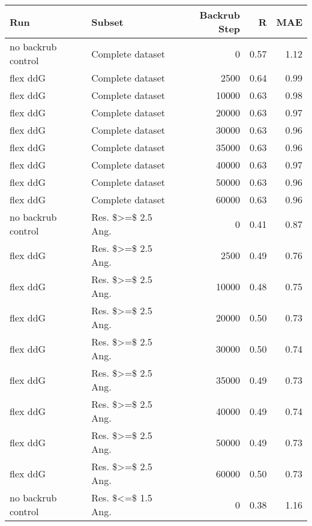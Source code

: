 \begin{table}
\begin{tabular}{llrrr}
\toprule
                Run &                          Subset &  Backrub Step &    R &  MAE \\
\midrule
 no backrub control &                Complete dataset &             0 & 0.57 & 1.12 \\
           flex ddG &                Complete dataset &          2500 & 0.64 & 0.99 \\
           flex ddG &                Complete dataset &         10000 & 0.63 & 0.98 \\
           flex ddG &                Complete dataset &         20000 & 0.63 & 0.97 \\
           flex ddG &                Complete dataset &         30000 & 0.63 & 0.96 \\
           flex ddG &                Complete dataset &         35000 & 0.63 & 0.96 \\
           flex ddG &                Complete dataset &         40000 & 0.63 & 0.97 \\
           flex ddG &                Complete dataset &         50000 & 0.63 & 0.96 \\
           flex ddG &                Complete dataset &         60000 & 0.63 & 0.96 \\
 no backrub control &              Res. \$>=\$ 2.5 Ang. &             0 & 0.41 & 0.87 \\
           flex ddG &              Res. \$>=\$ 2.5 Ang. &          2500 & 0.49 & 0.76 \\
           flex ddG &              Res. \$>=\$ 2.5 Ang. &         10000 & 0.48 & 0.75 \\
           flex ddG &              Res. \$>=\$ 2.5 Ang. &         20000 & 0.50 & 0.73 \\
           flex ddG &              Res. \$>=\$ 2.5 Ang. &         30000 & 0.50 & 0.74 \\
           flex ddG &              Res. \$>=\$ 2.5 Ang. &         35000 & 0.49 & 0.73 \\
           flex ddG &              Res. \$>=\$ 2.5 Ang. &         40000 & 0.49 & 0.74 \\
           flex ddG &              Res. \$>=\$ 2.5 Ang. &         50000 & 0.49 & 0.73 \\
           flex ddG &              Res. \$>=\$ 2.5 Ang. &         60000 & 0.50 & 0.73 \\
 no backrub control &              Res. \$<=\$ 1.5 Ang. &             0 & 0.38 & 1.16 \\

\end{tabular}
\end{table}
